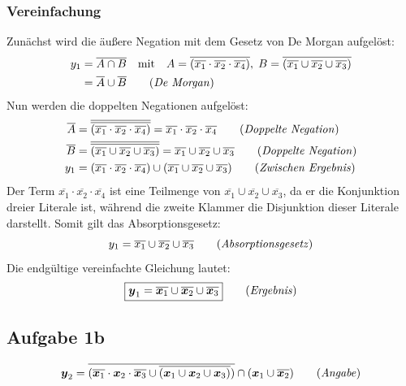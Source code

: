 \subsubsection{Vereinfachung}
Zunächst wird die äußere Negation mit dem Gesetz von De Morgan aufgelöst:
\begin{align}
    y_1 &= \overline{ A \cap B } \quad \text{mit} \quad 
    A = \overline{(\overline{x_1} \cdot \overline{x_2} \cdot \overline{x_4})},\; 
    B = \overline{(\overline{x_1} \cup \overline{x_2} \cup \overline{x_3})} \nonumber \\
    &= \overline{A} \cup \overline{B} \tag{\textit{De Morgan}}
\end{align}
Nun werden die doppelten Negationen aufgelöst:
\begin{align}
    \overline{A} &= \overline{ \overline{(\overline{x_1} \cdot \overline{x_2} \cdot \overline{x_4})} } 
    = \overline{x_1} \cdot \overline{x_2} \cdot \overline{x_4} \tag{\textit{Doppelte Negation}} \\
    \overline{B} &= \overline{ \overline{(\overline{x_1} \cup \overline{x_2} \cup \overline{x_3})} } 
    = \overline{x_1} \cup \overline{x_2} \cup \overline{x_3} \tag{\textit{Doppelte Negation}} \\
    y_1 &= (\overline{x_1} \cdot \overline{x_2} \cdot \overline{x_4}) 
    \cup (\overline{x_1} \cup \overline{x_2} \cup \overline{x_3}) \tag{\textit{Zwischen Ergebnis}}
\end{align}
Der Term $\overline{x_1} \cdot \overline{x_2} \cdot \overline{x_4}$ ist eine Teilmenge 
von $\overline{x_1} \cup \overline{x_2} \cup \overline{x_3}$, da er die Konjunktion 
dreier Literale ist, während die zweite Klammer die Disjunktion dieser Literale darstellt. 
Somit gilt das Absorptionsgesetz:
\begin{equation}
    y_1 = \overline{x_1} \cup \overline{x_2} \cup \overline{x_3} \tag{\textit{Absorptionsgesetz}}
\end{equation}
Die endgültige vereinfachte Gleichung lautet:
\begin{equation}
    \boxed{ \boldsymbol{y}_1 = \overline{\boldsymbol{x}_1} \cup \overline{\boldsymbol{x}_2} \cup \overline{\boldsymbol{x}_3} } \tag{\textit{Ergebnis}}
\end{equation}
\subsection{Aufgabe 1b}
\begin{equation}
    \boldsymbol{y}_2 = \overline{(\overline{\boldsymbol{x}_1} \cdot \boldsymbol{x}_2 \cdot \overline{\boldsymbol{x}_3} \cup \overline{(\boldsymbol{x}_1 \cup \boldsymbol{x}_2 \cup \boldsymbol{x}_3)})} \cap (\boldsymbol{x}_1 \cup \overline{\boldsymbol{x}_2}) \tag{\textit{Angabe}}
\end{equation}
